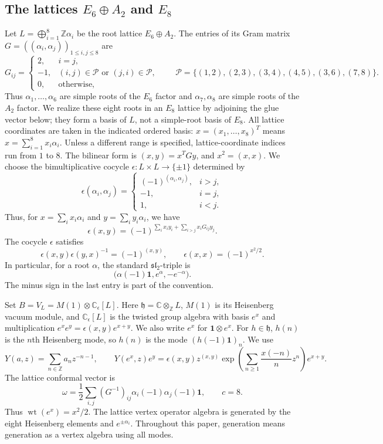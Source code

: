\documentclass[11pt,reqno]{amsart}
\theoremstyle{definition}\newtheorem{definition}[theorem]{Definition}
\theoremstyle{remark}\newtheorem{remark}[theorem]{Remark}
\newcommand{\C}{\mathbb C}\newcommand{\Z}{\mathbb Z}\newcommand{\Q}{\mathbb Q}
\newcommand{\one}{\mathbf1}\newcommand{\slc}{\mathfrak{sl}_2}
\newcommand{\wt}{\operatorname{wt}}\newcommand{\eps}{\epsilon}
\numberwithin{equation}{section}
\begin{document}
\subsection{The lattices \texorpdfstring{$E_6\oplus A_2$ and $E_8$}{E6 + A2 and E8}}\label{subsec:latticeconventions}
Let $L=\bigoplus_{i=1}^8\Z\alpha_i$ be the root lattice $E_6\oplus A_2$. The entries of its Gram matrix $G=((\alpha_i,\alpha_j))_{1\le i,j\le8}$ are
\begin{equation}\label{eq:grammatrix}
 G_{ij}=\begin{cases}
 2,&i=j,\\
 -1,&(i,j)\in\mathcal P\text{ or }(j,i)\in\mathcal P,\\
 0,&\text{otherwise},
 \end{cases}
 \qquad
 \mathcal P=\{(1,2),(2,3),(3,4),(4,5),(3,6),(7,8)\}.
\end{equation}
Thus $\alpha_1,\ldots,\alpha_6$ are simple roots of the $E_6$ factor and $\alpha_7,\alpha_8$ are simple roots of the $A_2$ factor. We realize these eight roots in an $E_8$ lattice by adjoining the glue vector below; they form a basis of $L$, not a simple-root basis of $E_8$. All lattice coordinates are taken in the indicated ordered basis: $x=(x_1,\ldots,x_8)^T$ means $x=\sum_{i=1}^8x_i\alpha_i$. Unless a different range is specified, lattice-coordinate indices run from $1$ to $8$. The bilinear form is $(x,y)=x^TGy$, and $x^2=(x,x)$. We choose the bimultiplicative cocycle $\eps:L\times L\to\{\pm1\}$ determined by
\[
 \eps(\alpha_i,\alpha_j)=\begin{cases}
 (-1)^{(\alpha_i,\alpha_j)},&i>j,\\
 -1,&i=j,\\
 1,&i<j.
 \end{cases}
\]
Thus, for $x=\sum_i x_i\alpha_i$ and $y=\sum_i y_i\alpha_i$, we have
\begin{equation}\label{eq:cocycle}
 \eps(x,y)=(-1)^{\sum_i x_i y_i+\sum_{i>j}x_iG_{ij}y_j}.
\end{equation}
The cocycle $\eps$ satisfies
\[
 \eps(x,y)\eps(y,x)^{-1}=(-1)^{(x,y)},\qquad
 \eps(x,x)=(-1)^{x^2/2}.
\]
In particular, for a root $\alpha$, the standard $\slc$-triple is
\[
 \bigl(\alpha(-1)\one,e^\alpha,-e^{-\alpha}\bigr).
\]
The minus sign in the last entry is part of the convention.

Set $B=V_L=M(1)\otimes\C_\eps[L]$. Here $\mathfrak h=\C\otimes_\Z L$, $M(1)$ is its Heisenberg vacuum module, and $\C_\eps[L]$ is the twisted group algebra with basis $e^x$ and multiplication $e^xe^y=\eps(x,y)e^{x+y}$. We also write $e^x$ for $\one\otimes e^x$. For $h\in\mathfrak h$, $h(n)$ is the $n$th Heisenberg mode, so $h(n)$ is the mode $(h(-1)\one)_n$. We use
\[
 Y(a,z)=\sum_{n\in\Z}a_{n}z^{-n-1},\qquad
 Y(e^x,z)e^y=\eps(x,y)z^{(x,y)}
 \exp\!\left(\sum_{n\ge1}\frac{x(-n)}n z^n\right)e^{x+y}.
\]
The lattice conformal vector is
\begin{equation}\label{eq:omega}
 \omega=\frac12\sum_{i,j}(G^{-1})_{ij}\alpha_i(-1)\alpha_j(-1)\one,
 \qquad c=8.
\end{equation}
Thus $\wt(e^x)=x^2/2$. The lattice vertex operator algebra is generated by the eight Heisenberg elements and $e^{\pm\alpha_i}$. Throughout this paper, generation means generation as a vertex algebra using all modes.
\end{document}
